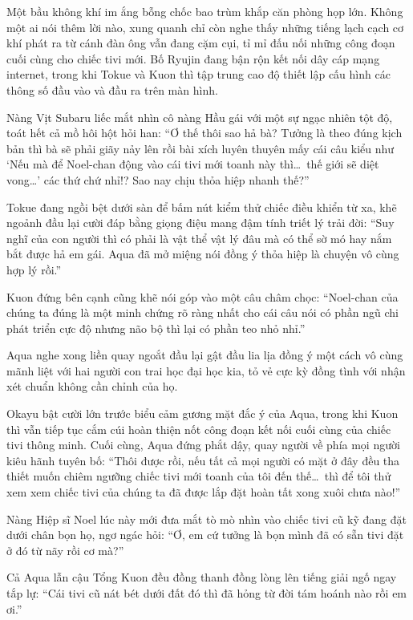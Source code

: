 \documentclass[../main.tex]{subfiles}
\begin{document}
Một bầu không khí im ắng bỗng chốc bao trùm khắp căn phòng họp lớn. Không một ai nói thêm lời nào, xung quanh chỉ còn nghe thấy những tiếng lạch cạch cơ khí phát ra từ cánh đàn ông vẫn đang cặm cụi, tỉ mỉ đấu nối những công đoạn cuối cùng cho chiếc tivi mới. Bố Ryujin đang bận rộn kết nối dây cáp mạng internet, trong khi Tokue và Kuon thì tập trung cao độ thiết lập cấu hình các thông số đầu vào và đầu ra trên màn hình.


Nàng Vịt Subaru liếc mắt nhìn cô nàng Hầu gái với một sự ngạc nhiên tột độ, toát hết cả mồ hôi hột hỏi han: ``Ơ thế thôi sao hả bà? Tưởng là theo đúng kịch bản thì bà sẽ phải giãy nảy lên rồi bài xích luyên thuyên mấy cái câu kiểu như `Nếu mà để Noel-chan động vào cái tivi mới toanh này thì\dots\ thế giới sẽ diệt vong\dots' các thứ chứ nhỉ!? Sao nay chịu thỏa hiệp nhanh thế?''

Tokue đang ngồi bệt dưới sàn để bấm nút kiểm thử chiếc điều khiển từ xa, khẽ ngoảnh đầu lại cười đáp bằng giọng điệu mang đậm tính triết lý trải đời: ``Suy nghĩ của con người thì có phải là vật thể vật lý đâu mà có thể sờ mó hay nắm bắt được hả em gái. Aqua đã mở miệng nói đồng ý thỏa hiệp là chuyện vô cùng hợp lý rồi.''

Kuon đứng bên cạnh cũng khẽ nói góp vào một câu châm chọc: ``Noel-chan của chúng ta đúng là một minh chứng rõ ràng nhất cho cái câu nói có phần ngũ chi phát triển cực độ nhưng não bộ thì lại có phần teo nhỏ nhỉ.''

Aqua nghe xong liền quay ngoắt đầu lại gật đầu lia lịa đồng ý một cách vô cùng mãnh liệt với hai người con trai học đại học kia, tỏ vẻ cực kỳ đồng tình với nhận xét chuẩn không cần chỉnh của họ.

Okayu bật cười lớn trước biểu cảm gương mặt đắc ý của Aqua, trong khi Kuon thì vẫn tiếp tục cắm cúi hoàn thiện nốt công đoạn kết nối cuối cùng của chiếc tivi thông minh. Cuối cùng, Aqua đứng phắt dậy, quay người về phía mọi người kiêu hãnh tuyên bố: ``Thôi được rồi, nếu tất cả mọi người có mặt ở đây đều tha thiết muốn chiêm ngưỡng chiếc tivi mới toanh của tôi đến thế\dots\ thì để tôi thử xem xem chiếc tivi của chúng ta đã được lắp đặt hoàn tất xong xuôi chưa nào!''

Nàng Hiệp sĩ Noel lúc này mới đưa mắt tò mò nhìn vào chiếc tivi cũ kỹ đang đặt dưới chân bọn họ, ngơ ngác hỏi: ``Ơ, em cứ tưởng là bọn mình đã có sẵn tivi đặt ở đó từ nãy rồi cơ mà?''

Cả Aqua lẫn cậu Tổng Kuon đều đồng thanh đồng lòng lên tiếng giải ngố ngay tắp lự: ``Cái tivi cũ nát bét dưới đất đó thì đã hỏng từ đời tám hoánh nào rồi em ơi.''
\end{document}
